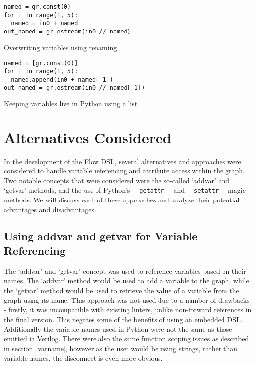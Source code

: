 \renewcommand\theFancyVerbLine{\arabic{FancyVerbLine}}
\begin{listing}[H]
  \begin{verbatim}
named = gr.const(0)
for i in range(1, 5):
  named = in0 + named
out_named = gr.ostream(in0 // named)
  \end{verbatim}
  \caption{Overwriting variables using renaming}\label{python.varname.loop}
\end{listing}

\renewcommand\theFancyVerbLine{\arabic{FancyVerbLine}}
\begin{listing}[H]
  \begin{verbatim}
named = [gr.const(0)]
for i in range(1, 5):
  named.append(in0 + named[-1])
out_named = gr.ostream(in0 // named[-1])
  \end{verbatim}
  \caption{Keeping variables live in Python using a list}\label{python.varname.array}
\end{listing}

\section{Alternatives Considered}

In the development of the Flow DSL, several alternatives and approaches were considered to handle variable referencing and attribute access within the graph. Two notable concepts that were considered were the so-called `addvar' and `getvar' methods, and the use of Python's \lstinline|__getattr__| and \lstinline|__setattr__| magic methods. We will discuss each of these approaches and analyze their potential advantages and disadvantages.

\subsection{Using addvar and getvar for Variable Referencing}
The `addvar' and `getvar' concept was used to reference variables based on their names. The `addvar' method would be used to add a variable to the graph, while the `getvar' method would be used to retrieve the value of a variable from the graph using its name. This approach was not used due to a number of drawbacks \hyphen{} firstly, it was incompatible with existing linters, unlike non-forward references in the final version. This negates some of the benefits of using an embedded DSL. Additionally the variable names used in Python were not the same as those emitted in Verilog. There were also the same function scoping issues as described in section \ref{varname}, however as the user would be using strings, rather than variable names, the disconnect is even more obvious.

